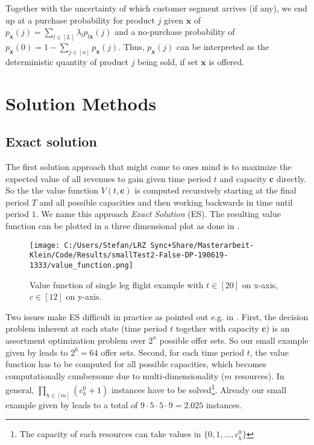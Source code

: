 Together with the uncertainty of which customer segment arrives (if any), we end up at a purchase probability for product $j$ given $\boldsymbol{x}$ of $p_{\boldsymbol{x}}(j) = \sum_{l \in [L]} \lambda_l p_{l\boldsymbol{x}}(j)$ and a no-purchase probability of $p_{\boldsymbol{x}}(0) = 1-\sum_{j\in[n]}p_{\boldsymbol{x}}(j)$. Thus, $p_{\boldsymbol{x}}(j)$ can be interpreted as the deterministic quantity of product $j$ being sold, if set $\boldsymbol{x}$ is offered.
 

\section{Solution Methods}\label{s:Metho}



\subsection{Exact solution}

The first solution approach that might come to ones mind is to maximize the expected value of all revenues to gain given time period $t$ and capacity $\boldsymbol{c}$ directly. So the the value function $V(t, \boldsymbol{c})$ is computed recursively starting at the final period $T$ and all possible capacities and then working backwards in time until period $1$. We name this approach \emph{Exact Solution} (ES).
The resulting value function can be plotted in a three dimensional plot as done in .

\begin{figure}
\caption{\label{fig-valueFunc} Value function of single leg flight example with $t \in [20]$ on x-axis, $c \in [12]$ on y-axis.}
\texttt{[image: C:/Users/Stefan/LRZ Sync+Share/Masterarbeit-Klein/Code/Results/smallTest2-False-DP-190619-1333/value\_function.png]}
\end{figure}

Two issues make ES difficult in practice as pointed out e.g. in \cite{Koch.2017}. First, the decision problem inherent at each state (time period $t$ together with capacity $\boldsymbol{c}$) is an assortment optimization problem over $2^n$ possible offer sets. 
So our small example given by  leads to $2^6 = 64$ offer sets.
Second, for each time period $t$, the value function  has to be computed for all possible capacities, which becomes computationally cumbersome due to multi-dimensionality ($m$ resources). In general, $\prod_{h \in [m]} (c^0_h+1)$ instances have to be solved\footnote{The capacity of each resources can take values in $\{0, 1, \dots, c^0_h\}$}. Already our small example given by  leads to a total of $9\cdot 5\cdot 5\cdot 9 = 2.025$ instances.


